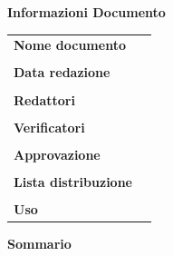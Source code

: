 \begin{center}
\vspace{1cm}
	\textbf{\Large Informazioni Documento} \\[10pt]
	\begin{longtable}{l|p{150pt}}
		\textbf{Nome documento} & \documentName \\ & \\
		\textbf{Data redazione} & \documentDate \\ & \\
		\textbf{Redattori} & \parbox[t]{\linewidth}{\documentEditors} \\ & \\
		\textbf{Verificatori} & \parbox{\linewidth}{\documentVerifiers} \\ & \\
		\textbf{Approvazione} & \parbox{\linewidth}{\documentApprovers} \\ & \\
		\textbf{Lista distribuzione} & \parbox{\linewidth}{\documentDistributionList} \\ & \\
		\textbf{Uso} & \parbox{\linewidth}{\documentUsage} \\
	\end{longtable}
	\vspace{10pt}
	\textbf{\Large Sommario} \\
\end{center}
\documentSummary